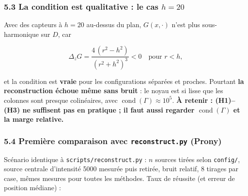 \documentclass[
  french,
]{article}
\begin{document}
\subsubsection{\texorpdfstring{5.3 La condition est qualitative : le cas
\(h = 20\)}{5.3 La condition est qualitative : le cas h = 20}}\label{la-condition-est-qualitative-le-cas-h-20}

Avec des capteurs à \(h = 20\) au-dessus du plan, \(G(x,\cdot)\) n'est
plus sous-harmonique sur \(D\), car

\[
\Delta_z G = \frac{4\,(r^2-h^2)}{(r^2+h^2)^3} < 0 \quad\text{pour } r < h,
\]

et la condition est \textbf{vraie} pour les configurations séparées et
proches. Pourtant \textbf{la reconstruction échoue même sans bruit} : le
noyau est si lisse que les colonnes sont presque colinéaires, avec
\(\operatorname{cond}(\Gamma)\approx 10^5\). \textbf{À retenir :
(H1)--(H3) ne suffisent pas en pratique ; il faut aussi regarder
\(\operatorname{cond}(\Gamma)\) et la marge relative.}

\subsubsection{\texorpdfstring{5.4 Première comparaison avec
\texttt{reconstruct.py}
(Prony)}{5.4 Première comparaison avec reconstruct.py (Prony)}}\label{premiuxe8re-comparaison-avec-reconstruct.py-prony}

Scénario identique à \texttt{scripts/reconstruct.py} : \(n\) sources
tirées selon \texttt{config/}, source centrale d'intensité 5000 mesurée
puis retirée, bruit relatif, 8 tirages par case, mêmes mesures pour
toutes les méthodes. Taux de réussite (et erreur de position médiane) :
\end{document}
